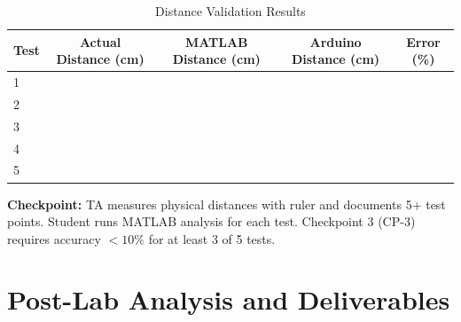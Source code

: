 \documentclass[11pt,letterpaper]{article}
\providecommand{\cpECE}[1]{\textcolor{OliveGreen}{\textbf{Checkpoint:} #1}}
\begin{document}
\begin{table}[H]
    \centering
    \caption{Distance Validation Results}
    \label{tab:distances}
    \begin{tabularx}{\linewidth}{l c c c c}
    \toprule
    \textbf{Test} & \textbf{Actual Distance (cm)} & \textbf{MATLAB Distance (cm)} & \textbf{Arduino Distance (cm)} & \textbf{Error (\%)}\\
    \midrule
    1 & \underline{\hspace{1.5cm}} & \underline{\hspace{1.5cm}} & \underline{\hspace{1.5cm}} & \underline{\hspace{1.2cm}} \\
    2 & \underline{\hspace{1.5cm}} & \underline{\hspace{1.5cm}} & \underline{\hspace{1.5cm}} & \underline{\hspace{1.2cm}} \\
    3 & \underline{\hspace{1.5cm}} & \underline{\hspace{1.5cm}} & \underline{\hspace{1.5cm}} & \underline{\hspace{1.2cm}} \\
    4 & \underline{\hspace{1.5cm}} & \underline{\hspace{1.5cm}} & \underline{\hspace{1.5cm}} & \underline{\hspace{1.2cm}} \\
    5 & \underline{\hspace{1.5cm}} & \underline{\hspace{1.5cm}} & \underline{\hspace{1.5cm}} & \underline{\hspace{1.2cm}} \\
    \bottomrule
    \end{tabularx}
\end{table}

\cpECE{TA measures physical distances with ruler and documents 5+ test points. Student runs MATLAB analysis for each test. Checkpoint 3 (CP-3) requires accuracy $< 10\%$ for at least 3 of 5 tests.}

\clearpage

\section{Post-Lab Analysis and Deliverables}
\end{document}
